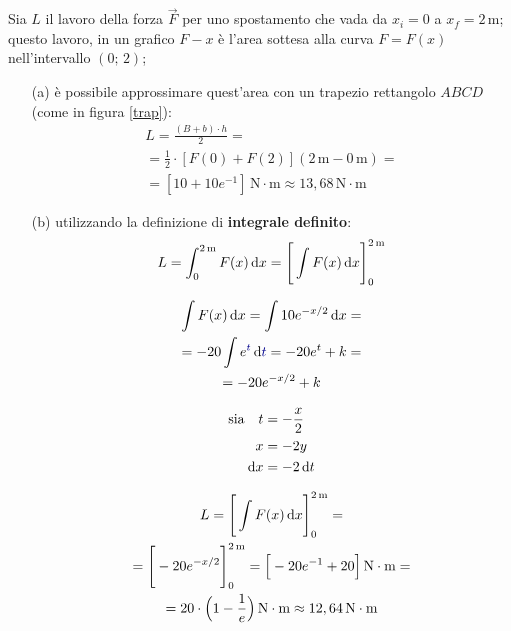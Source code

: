 \documentclass[a4paper, oneside, titlepage, reqno]{book}
\begin{document}
Sia $L$ il lavoro della forza $\vec{F}$ per uno spostamento che vada da $x_i=0$ a $x_f=2\,\text{m}$; questo lavoro, in un grafico $F-x$ è l'area sottesa alla curva $F=F(x)$ nell'intervallo $(0;\,2)$;
\begin{itemize}
\item[(a)] \label{L:a} è possibile approssimare quest'area con un trapezio rettangolo $ABCD$ (come in figura \ref{trap}):
\begin{multline*}
L=\frac{(B+b)\cdot h}{2}=\\=\frac{1}{2}\cdot [F(0)+F(2)](2\,\text{m}-0\,\text{m})=\\=[10+10e^{-1}]\,\text{N}\cdot\text{m}\approx 13,68\,\text{N}\cdot\text{m}
\end{multline*}
\item [(b)] \label{L:b} utilizzando la definizione di \textbf{integrale definito}:
\[
L=\int_{0}^{2\,\text{m}}F(x)\dif x=\Bigg[\int F(x) \dif x\Bigg]^{2\,\text{m}}_{0}
\]

\begin{minipage}{\textwidth}
\begin{tcolorbox}[colframe=blue!0!, colback=blue!3!, top=0mm, bottom=0mm]
\begin{multicols}{2}
\begin{gather*}
\int F(x) \dif x=\int 10e^{-x/2}\dif x=\\
=-20\int e^{\textcolor{blue}{t}}\dif \textcolor{blue}{t}=-20e^t+k=\\
=-20e^{-x/2}+k
\end{gather*}
\columnbreak

\begin{align*}
\text{sia}\quad t&=-\frac{x}{2}\\
x&=-2y\\
\dif x &= -2\dif t
\end{align*}
\end{multicols}
\end{tcolorbox}
\end{minipage}
\begin{multline*}
L=\Bigg[\int F(x) \dif x\Bigg]^{2\,\text{m}}_{0}=\\
=\Bigg[-20e^{-x/2}\Bigg]^{2\,\text{m}}_{0}=\Big[-20e^{-1}+20\Big]\,\text{N}\cdot\text{m}=\\
=20\cdot\Big(1-\frac{1}{e}\Big)\,\text{N}\cdot\text{m}\approx 12,64\,\text{N}\cdot\text{m}
\end{multline*}
\end{itemize}
\end{document}

